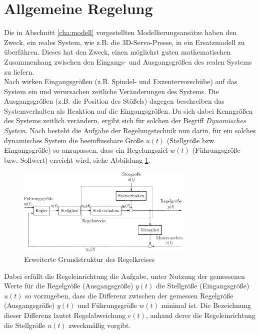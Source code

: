 \section{Allgemeine Regelung}
\label{cha:regelung}

Die in Abschnitt \ref{cha:modell} vorgestellten Modellierungsansätze haben den Zweck, ein reales System, wie z.B. die 3D-Servo-Presse, in ein Ersatzmodell zu überführen. Dieses hat den Zweck, einen möglichst guten mathematischen Zusammenhang zwischen den Eingangs- und Ausgangsgrößen des realen Systems zu liefern. \\
Nach \cite{Lunze.2013} wirken Eingangsgrößen (z.B. Spindel- und Exzentervorschübe) auf das System ein und verursachen zeitliche Veränderungen des Systems. Die Ausgangsgrößen (z.B. die Position des Stößels) dagegen beschreiben das Systemverhalten als Reaktion auf die Eingangsgrößen. Da sich dabei Kenngrößen des Systems zeitlich verändern, ergibt sich für solchen der Begriff \textit{Dynamisches System}. Nach \cite{Lunze.2013} besteht die Aufgabe der Regelungstechnik nun darin, für ein solches dynamisches System die beeinflussbare Größe $u(t)$ (Stellgröße bzw. Eingangsgröße) so anzupassen, dass ein Regelungsziel $w(t)$ (Führungsgröße bzw. Sollwert) erreicht wird, siehe Abbildung \ref{fig:regelkreis}.

\begin{figure} 
	\centering
	\includegraphics[width=0.75\textwidth]{images/Regelkreis}
	\caption{Erweiterte Grundstruktur des Regelkreises \cite{Lunze.2013}}
	\label{fig:regelkreis}
\end{figure}




Dabei erfüllt die Regeleinrichtung die Aufgabe, unter Nutzung der gemessenen Werte für die Regelgröße (Ausgangsgröße) $y(t)$ die Stellgröße (Eingangsgröße) $u(t)$ so vorzugeben, dass die Differenz zwischen der gemessen Regelgröße (Ausgangsgröße) $y(t)$ und Führungsgröße $w(t)$ minimal ist.  Die Bezeichnung dieser Differenz lautet Regelabweichung $e(t)$, anhand derer die Regeleinrichtung die Stellgröße $u(t)$ zweckmäßig vorgibt. \cite{Lunze.2013}
  

